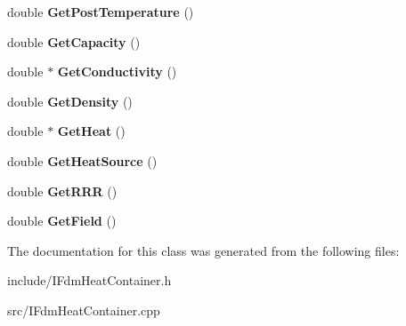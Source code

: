 \begin{DoxyCompactItemize}
\item 
\hypertarget{class_f_d_m_1_1_i_fdm_heat_container_abe3b29a7dd874ba6deb0fca95a95dbc8}{}double {\bfseries Get\+Post\+Temperature} ()\label{class_f_d_m_1_1_i_fdm_heat_container_abe3b29a7dd874ba6deb0fca95a95dbc8}

\item 
\hypertarget{class_f_d_m_1_1_i_fdm_heat_container_a28cd38c64a7bac5a957e22501b061728}{}double {\bfseries Get\+Capacity} ()\label{class_f_d_m_1_1_i_fdm_heat_container_a28cd38c64a7bac5a957e22501b061728}

\item 
\hypertarget{class_f_d_m_1_1_i_fdm_heat_container_a73f5fffeb0013ff812e45717a284af19}{}double $\ast$ {\bfseries Get\+Conductivity} ()\label{class_f_d_m_1_1_i_fdm_heat_container_a73f5fffeb0013ff812e45717a284af19}

\item 
\hypertarget{class_f_d_m_1_1_i_fdm_heat_container_a54f049a4eed8d05268c22e77f4e04ed6}{}double {\bfseries Get\+Density} ()\label{class_f_d_m_1_1_i_fdm_heat_container_a54f049a4eed8d05268c22e77f4e04ed6}

\item 
\hypertarget{class_f_d_m_1_1_i_fdm_heat_container_aace4b7020820bf2af0880c6d5fd9eab3}{}double $\ast$ {\bfseries Get\+Heat} ()\label{class_f_d_m_1_1_i_fdm_heat_container_aace4b7020820bf2af0880c6d5fd9eab3}

\item 
\hypertarget{class_f_d_m_1_1_i_fdm_heat_container_acbee2852d778295ccb12901baee88a90}{}double {\bfseries Get\+Heat\+Source} ()\label{class_f_d_m_1_1_i_fdm_heat_container_acbee2852d778295ccb12901baee88a90}

\item 
\hypertarget{class_f_d_m_1_1_i_fdm_heat_container_a82b353d64997d3e6e0db14d996044985}{}double {\bfseries Get\+R\+R\+R} ()\label{class_f_d_m_1_1_i_fdm_heat_container_a82b353d64997d3e6e0db14d996044985}

\item 
\hypertarget{class_f_d_m_1_1_i_fdm_heat_container_a487ccf66994f99aca1f785cb65bc063d}{}double {\bfseries Get\+Field} ()\label{class_f_d_m_1_1_i_fdm_heat_container_a487ccf66994f99aca1f785cb65bc063d}

\end{DoxyCompactItemize}


The documentation for this class was generated from the following files\+:\begin{DoxyCompactItemize}
\item 
include/I\+Fdm\+Heat\+Container.\+h\item 
src/I\+Fdm\+Heat\+Container.\+cpp\end{DoxyCompactItemize}
